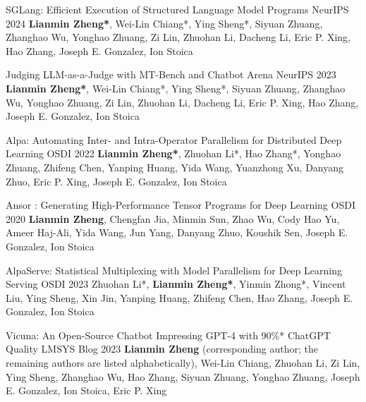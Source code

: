
\begin{cventries}


\cventry
{}
{SGLang: Efficient Execution of Structured Language Model Programs} %
{NeurIPS 2024} %
{} %
{\textbf{Lianmin Zheng*}, Wei-Lin Chiang*, Ying Sheng*, Siyuan Zhuang, Zhanghao Wu, Yonghao Zhuang, Zi Lin, Zhuohan Li, Dacheng Li, Eric P. Xing, Hao Zhang, Joseph E. Gonzalez, Ion Stoica}

\cventry
{}
{Judging LLM-as-a-Judge with MT-Bench and Chatbot Arena} %
{NeurIPS 2023} %
{} %
{\textbf{Lianmin Zheng*}, Wei-Lin Chiang*, Ying Sheng*, Siyuan Zhuang, Zhanghao Wu, Yonghao Zhuang, Zi Lin, Zhuohan Li, Dacheng Li, Eric P. Xing, Hao Zhang, Joseph E. Gonzalez, Ion Stoica}

\cventry
{}
{Alpa: Automating Inter- and Intra-Operator Parallelism for Distributed Deep Learning} %
{OSDI 2022} %
{} %
{\textbf{Lianmin Zheng*}, Zhuohan Li*, Hao Zhang*, Yonghao Zhuang, Zhifeng Chen, Yanping Huang, Yida Wang, Yuanzhong Xu, Danyang Zhuo, Eric P. Xing, Joseph E. Gonzalez, Ion Stoica}

\cventry
{}
{Ansor : Generating High-Performance Tensor Programs for Deep Learning} %
{OSDI 2020} %
{} %
{\textbf{Lianmin Zheng}, Chengfan Jia, Minmin Sun, Zhao Wu, Cody Hao Yu, Ameer Haj-Ali, Yida Wang, Jun Yang, Danyang Zhuo, Koushik Sen, Joseph E. Gonzalez, Ion Stoica}

\cventry
{}
{AlpaServe: Statistical Multiplexing with Model Parallelism for Deep Learning Serving} %
{OSDI 2023} %
{} %
{Zhuohan Li*, \textbf{Lianmin Zheng*}, Yinmin Zhong*, Vincent Liu, Ying Sheng, Xin Jin, Yanping Huang, Zhifeng Chen, Hao Zhang, Joseph E. Gonzalez, Ion Stoica}

\cventry
{}
{Vicuna: An Open-Source Chatbot Impressing GPT-4 with 90\%* ChatGPT Quality} %
{LMSYS Blog 2023} %
{} %
{\textbf{Lianmin Zheng} (corresponding author; the remaining authors are listed alphabetically), Wei-Lin Chiang, Zhuohan Li, Zi Lin, Ying Sheng, Zhanghao Wu, Hao Zhang, Siyuan Zhuang, Yonghao Zhuang, Joseph E. Gonzalez, Ion Stoica, Eric P. Xing}


\end{cventries}
